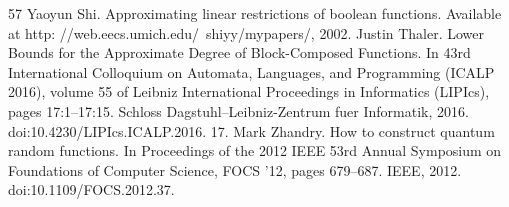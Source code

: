 \documentclass[10pt,a4paper]{article}
\newcommand{\<}{\langle}
\renewcommand{\>}{\rangle}
\begin{document}
\begin{thebibliography}{57}
 Yaoyun Shi. Approximating linear restrictions of boolean functions. Available at http: //web.eecs.umich.edu/~shiyy/mypapers/, 2002.
 Justin Thaler. Lower Bounds for the Approximate Degree of Block-Composed Functions. In 43rd International Colloquium on Automata, Languages, and Programming (ICALP 2016), volume 55 of Leibniz International Proceedings in Informatics (LIPIcs), pages 17:1–17:15. Schloss Dagstuhl–Leibniz-Zentrum fuer Informatik, 2016. doi:10.4230/LIPIcs.ICALP.2016. 17.
 Mark Zhandry. How to construct quantum random functions. In Proceedings of the 2012 IEEE 53rd Annual Symposium on Foundations of Computer Science, FOCS ’12, pages 679–687. IEEE, 2012. doi:10.1109/FOCS.2012.37.
\end{thebibliography}
\end{document}
